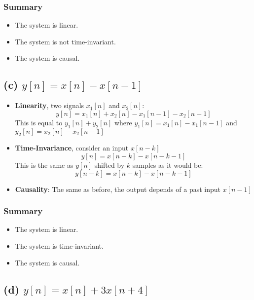 \subsubsection*{Summary}
\begin{itemize}
    \item The system is linear.
    \item The system is not time-invariant.
    \item The system is causal.
\end{itemize}


\subsection*{(c) $y[n]=x[n]-x[n-1]$}

\begin{itemize}
    \item \textbf{Linearity}, two signals $x_1[n]$ and $x_2[n]$:
    \subitem \begin{equation*} y[n] = x_{1}[n] + x_{2}[n] - x_{1}[n-1] - x_{2}[n-1] \end{equation*}
     This is equal to $y_1[n]+y_2[n]$ where $y_1[n]=x_1[n]-x_1[n-1]$ and $y_2[n]=x_2[n]-x_2[n-1]$
    \item \textbf{Time-Invariance}, consider an input $x[n-k]$
    \subitem \begin{equation*} y[n]= x[n-k]-x[n-k-1] \end{equation*}
    This is the same as $y[n]$ shifted by $k$ samples as it would be:
    \subitem \begin{equation*} y[n-k]=x[n-k]- x[n-k-1] \end{equation*}

    \item \textbf{Causality}: The same as before, the output depends of a past input $x[n-1]$
\end{itemize}

\subsubsection*{Summary}
\begin{itemize}
    \item The system is linear.
    \item The system is time-invariant.
    \item The system is causal.
\end{itemize}

\subsection*{(d) $y[n]=x[n]+3x[n+4]$}

